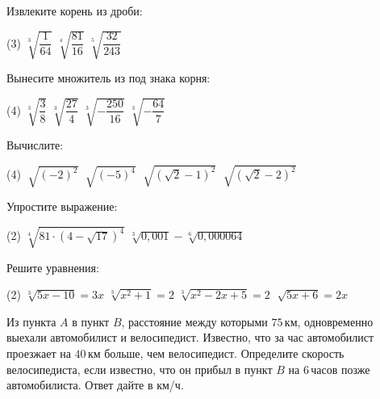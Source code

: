 \begin{class}[number=2]
\begin{listofex}
		\item Извлеките корень из дроби:
		\begin{tasks}(3)
			\task \( \sqrt[3]{\dfrac{1}{64}} \)
			\task \( \sqrt[4]{\dfrac{81}{16}} \)
			\task \( \sqrt[5]{\dfrac{32}{243}} \)
		\end{tasks}
		\item Вынесите множитель из под знака корня:
		\begin{tasks}(4)
			\task \( \sqrt[3]{\dfrac{3}{8}} \)
			\task \( \sqrt[3]{\dfrac{27}{4}} \)
			\task \( \sqrt[3]{-\dfrac{250}{16}} \)
			\task \( \sqrt[3]{-\dfrac{64}{7}} \)
		\end{tasks}
		\item Вычислите:
		\begin{tasks}(4)
			\task \( \sqrt[]{(-2)^2} \)
			\task \( \sqrt[]{(-5)^4} \)
			\task \( \sqrt[]{(\sqrt{2}-1)^2} \)
			\task \( \sqrt[]{(\sqrt{2}-2)^2} \)
		\end{tasks}
		\item Упростите выражение:
		\begin{tasks}(2)
			\task \( \sqrt[4]{81 \cdot (4-\sqrt{17})^4} \)
			\task \( \sqrt[3]{0,001} - \sqrt[6]{0,000064} \)
		\end{tasks}
		\item Решите уравнения:
		\begin{tasks}(2)
			\task \( \sqrt[3]{5x-10} = 3x \)
			\task \( \sqrt[3]{x^2+1}=2 \)
			\task \( \sqrt[3]{x^2-2x+5}=2 \)
			\task \( \sqrt[]{5x+6}=2x \)
		\end{tasks}
		\item Из пункта \(A\) в пункт \(B\), расстояние между которыми \(75\) км, одновременно выехали автомобилист и велосипедист. Известно, что за час автомобилист проезжает на \(40\) км больше, чем велосипедист. Определите скорость велосипедиста, если известно, что он прибыл в пункт \(B\) на \(6\) часов позже автомобилиста. Ответ дайте в км/ч.
	\end{listofex}
\end{class}

